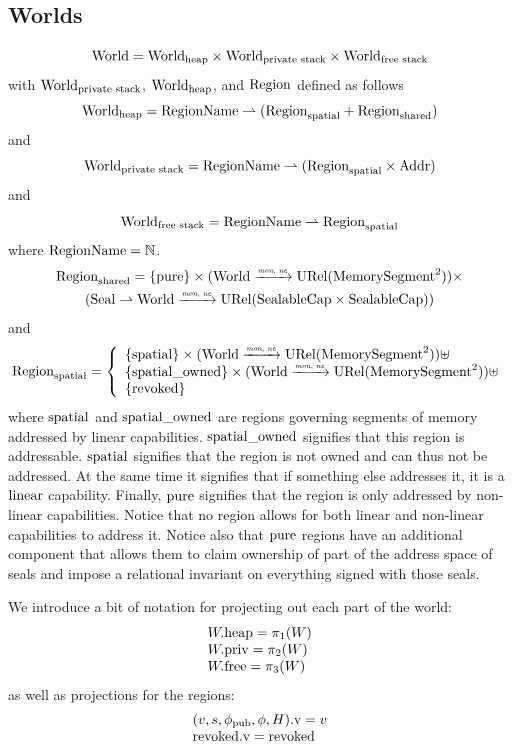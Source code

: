 \documentclass[a4paper]{article}
\begin{document}
\subsection{Worlds}
\[
  \mathrm{World} = \mathrm{World}_\mathrm{heap} \times \mathrm{World}_\text{private stack} \times \mathrm{World}_\text{free stack}
\]
with $\mathrm{World}_\text{private stack}$, $\mathrm{World}_\mathrm{heap}$, and $\mathrm{Region}$ defined as follows
\[
  \mathrm{World}_\mathrm{heap} = \mathrm{RegionName} \rightharpoonup (\mathrm{Region}_\mathrm{spatial} + \mathrm{Region}_\mathrm{shared})
\]
and
\[
  \mathrm{World}_\text{private stack} = \mathrm{RegionName} \rightharpoonup (\mathrm{Region}_\mathrm{spatial} \times \mathrm{Addr})
\]
and
\[
  \mathrm{World}_\text{free stack} = \mathrm{RegionName} \rightharpoonup \mathrm{Region}_\mathrm{spatial}
\]
where $\mathrm{RegionName} = \mathbb{N}$.
\begin{multline*}
  \mathrm{Region}_\mathrm{shared} = 
  \{\mathrm{pure} \} \times (\mathrm{World} \xrightarrow{\textit{\tiny{mon, ne}}} \mathrm{URel}(\mathrm{MemorySegment}^2)) \times \\
  (\mathrm{Seal} \rightharpoonup \mathrm{World} \xrightarrow{\textit{\tiny{mon, ne}}} \mathrm{URel}(\mathrm{SealableCap} \times \mathrm{SealableCap}))
\end{multline*}
and
\[
  \mathrm{Region}_\mathrm{spatial} = \left\{
  \begin{array}{l}
    \{\mathrm{spatial} \} \times (\mathrm{World} \xrightarrow{\textit{\tiny{mon, ne}}} \mathrm{URel}(\mathrm{MemorySegment}^2)) \uplus \\
    \{\mathrm{spatial\_owned} \} \times (\mathrm{World} \xrightarrow{\textit{\tiny{mon, ne}}} \mathrm{URel}(\mathrm{MemorySegment}^2))\uplus \\ 
    \{\mathrm{revoked}\}
  \end{array} \right.
\]
where $\mathrm{spatial}$ and $\mathrm{spatial\_owned}$ are regions governing segments of memory addressed by linear capabilities.
$\mathrm{spatial\_owned}$ signifies that this region is addressable.
$\mathrm{spatial}$ signifies that the region is not owned and can thus not be addressed.
At the same time it signifies that if something else addresses it, it is a $\mathrm{linear}$ capability.
Finally, $\mathrm{pure}$ signifies that the region is only addressed by non-linear capabilities.
Notice that no region allows for both linear and non-linear capabilities to address it.
Notice also that $\mathrm{pure}$ regions have an additional component that allows them to claim ownership of part of the address space of seals and impose a relational invariant on everything signed with those seals.


We introduce a bit of notation for projecting out each part of the world:
\[
  \begin{array}{l}
    W.\mathrm{heap} = \pi_1(W)\\
    W.\mathrm{priv} = \pi_2(W)\\
    W.\mathrm{free} = \pi_3(W)
  \end{array}
\]
as well as projections for the regions:
\[
  \begin{array}{l}
  (v,s,\phi_{\mathrm{pub}},\phi,H).\mathrm{v} = v \\
  \mathrm{revoked}.\mathrm{v} = \mathrm{revoked}     
  \end{array}
\]
\end{document}
